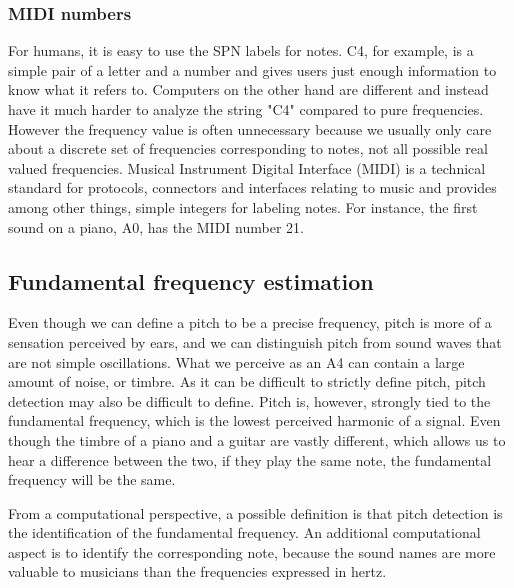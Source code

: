 \subsubsection{MIDI numbers}
For humans, it is easy to use the SPN labels for notes. C4, for example, is a simple pair of a letter and a number and gives users just enough information to know what it refers to. Computers on the other hand are different and instead have it much harder to analyze the string "C4" compared to pure frequencies. However the frequency value is often unnecessary because we usually only care about a discrete set of frequencies corresponding to notes, not all possible real valued frequencies. Musical Instrument Digital Interface (MIDI) is a technical standard for protocols, connectors and interfaces relating to music and provides among other things, simple integers for labeling notes. For instance, the first sound on a piano, A0, has the MIDI number 21. 


% 
\subsection{Fundamental frequency estimation}
Even though we can define a pitch to be a precise frequency, pitch is more of a sensation perceived by ears, and we can distinguish pitch from sound waves that are not simple oscillations. What we perceive as an A4 can contain a large amount of noise, or timbre. As it can be difficult to strictly define pitch, pitch detection may also be difficult to define. Pitch is, however, strongly tied to the fundamental frequency, which is the lowest perceived harmonic of a signal. Even though the timbre of a piano and a guitar are vastly different, which allows us to hear a difference between the two, if they play the same note, the fundamental frequency will be the same. 

From a computational perspective, a possible definition is that pitch detection is the identification of the fundamental frequency. An additional computational aspect is to identify the corresponding note, because the sound names are more valuable to musicians than the frequencies expressed in hertz. 

